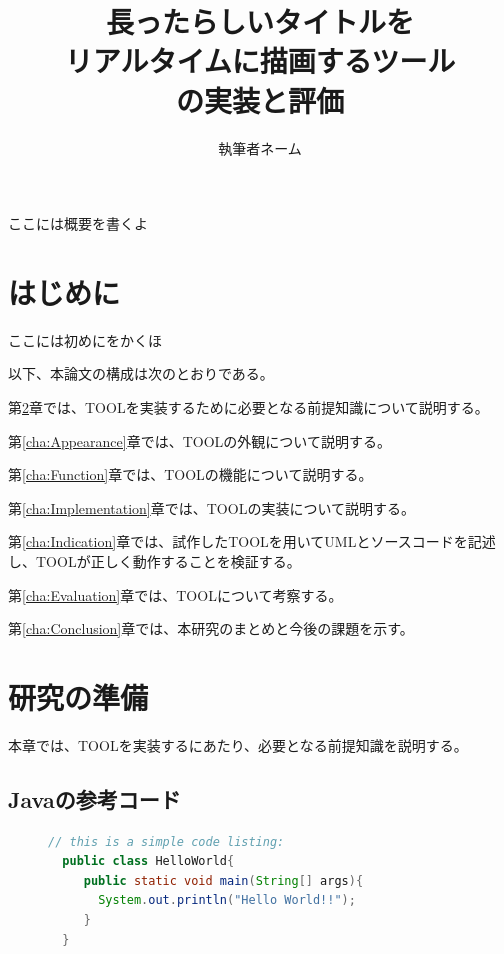 \documentclass[uplatex, report, a4j, 10pt, dvipdfmx]{jsbook}
\title{長ったらしいタイトルを \\ リアルタイムに描画するツール \\ \tool{}の実装と評価}
\author{執筆者ネーム}
\newcommand{\tool}{TOOL}
\begin{document}
\maketitle


ここには概要を書くよ


%
\chapter{はじめに}\label{cha:Introduction}

ここには初めにをかくほ

以下、本論文の構成は次のとおりである。

第\ref{cha:Preparation}章では、\tool{}を実装するために必要となる前提知識について説明する。

第\ref{cha:Appearance}章では、\tool{}の外観について説明する。

第\ref{cha:Function}章では、\tool{}の機能について説明する。

第\ref{cha:Implementation}章では、\tool{}の実装について説明する。

第\ref{cha:Indication}章では、試作した\tool{}を用いてUMLとソースコードを記述し、\tool{}が正しく動作することを検証する。

第\ref{cha:Evaluation}章では、\tool{}について考察する。

第\ref{cha:Conclusion}章では、本研究のまとめと今後の課題を示す。



\chapter{研究の準備}\label{cha:Preparation}

本章では、\tool{}を実装するにあたり、必要となる前提知識を説明する\cite{hirakoba, sqbok, vdmj}。

\section{Javaの参考コード}
\begin{figure}[tp]
  \begin{lstlisting}[caption={Javaの参考コード}, label={lst:example_java}, language=Java]
  // this is a simple code listing:
  public class HelloWorld{
     public static void main(String[] args){
       System.out.println("Hello World!!");
     }
  }
  \end{lstlisting}
  \end{figure}
  
\end{document}
